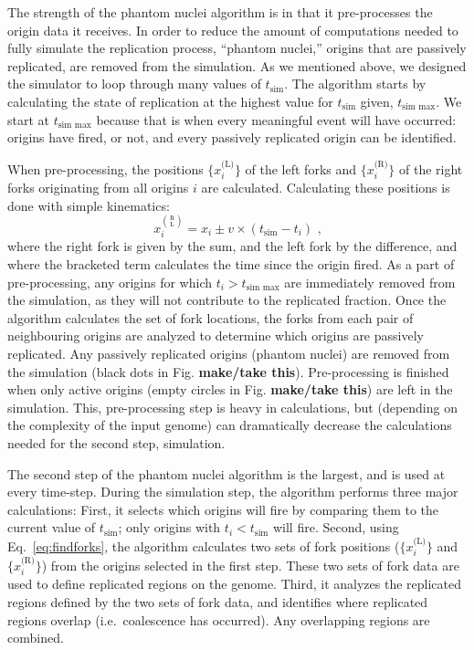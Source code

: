 		The strength of the phantom nuclei algorithm is in that it pre-processes the origin data it receives.
		In order to reduce the amount of computations needed to fully simulate the replication process, ``phantom nuclei,'' origins that are passively replicated, are removed from the simulation.
		As we mentioned above, we designed the simulator to loop through many values of $t_\text{sim}$.
		The algorithm starts by calculating the state of replication at the highest value for $t_\text{sim}$ given, $t_\text{sim max}$.
		We start at $t_\text{sim max}$ because that is when every meaningful event will have occurred: origins have fired, or not, and every passively replicated origin can be identified.
		
		When pre-processing, the positions $\{x_i^\text{(L)}\}$ of the left forks and $\{x_i^\text{(R)}\}$ of the right forks originating from all origins $i$ are calculated.
		Calculating these positions is done with simple kinematics:
		\begin{equation} \label{eq:findforks}
			x_i^{\binom{\text{R}}{\text{L}}} = x_i \pm v \times \left( t_\text{sim} - t_i\right) \text{ ,}
		\end{equation}
		where the right fork is given by the sum, and the left fork by the difference, and where the bracketed term calculates the time since the origin fired.
		As a part of pre-processing, any origins for which $t_i > t_\text{sim max}$ are immediately removed from the simulation, as they will not contribute to the replicated fraction.
		Once the algorithm calculates the set of fork locations, the forks from each pair of neighbouring origins are analyzed to determine which origins are passively replicated.
		Any passively replicated origins (phantom nuclei) are removed from the simulation (black dots in Fig. \textbf{make/take this}).
		Pre-processing is finished when only active origins (empty circles in Fig. \textbf{make/take this}) are left in the simulation.
		This, pre-processing step is heavy in calculations, but (depending on the complexity of the input genome) can dramatically decrease the calculations needed for the second step, simulation.
		
		The second step of the phantom nuclei algorithm is the largest, and is used at every time-step.
		During the simulation step, the algorithm performs three major calculations:
		First, it selects which origins will fire by comparing them to the current value of $t_\text{sim}$; only origins with $t_i < t_\text{sim}$ will fire.
		Second, using Eq.~\ref{eq:findforks}, the algorithm calculates two sets of fork positions ($\{x_i^\text{(L)}\}$ and $\{x_i^\text{(R)}\}$) from the origins selected in the first step.
		These two sets of fork data are used to define replicated regions on the genome.
		Third, it analyzes the replicated regions defined by the two sets of fork data, and identifies where replicated regions overlap (i.e.\ coalescence has occurred).
		Any overlapping regions are combined.
		
